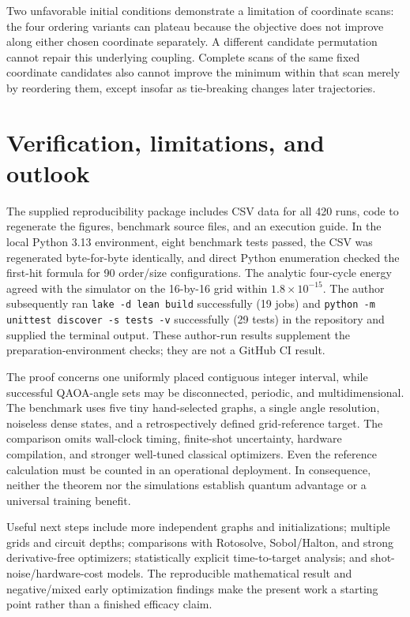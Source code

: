 \documentclass[10pt,a4paper]{article}
\begin{document}
Two unfavorable initial conditions demonstrate a limitation of coordinate scans: the four ordering variants can plateau because the objective does not improve along either chosen coordinate separately. A different candidate permutation cannot repair this underlying coupling. Complete scans of the same fixed coordinate candidates also cannot improve the minimum within that scan merely by reordering them, except insofar as tie-breaking changes later trajectories.

\section{Verification, limitations, and outlook}
The supplied reproducibility package includes CSV data for all 420 runs, code to regenerate the figures, benchmark source files, and an execution guide. In the local Python 3.13 environment, eight benchmark tests passed, the CSV was regenerated byte-for-byte identically, and direct Python enumeration checked the first-hit formula for 90 order/size configurations. The analytic four-cycle energy agreed with the simulator on the 16-by-16 grid within $1.8\times 10^{-15}$. The author subsequently ran \texttt{lake -d lean build} successfully (19 jobs) and \texttt{python -m unittest discover -s tests -v} successfully (29 tests) in the repository and supplied the terminal output. These author-run results supplement the preparation-environment checks; they are not a GitHub CI result.

The proof concerns one uniformly placed contiguous integer interval, while successful QAOA-angle sets may be disconnected, periodic, and multidimensional. The benchmark uses five tiny hand-selected graphs, a single angle resolution, noiseless dense states, and a retrospectively defined grid-reference target. The comparison omits wall-clock timing, finite-shot uncertainty, hardware compilation, and stronger well-tuned classical optimizers. Even the reference calculation must be counted in an operational deployment. In consequence, neither the theorem nor the simulations establish quantum advantage or a universal training benefit.

Useful next steps include more independent graphs and initializations; multiple grids and circuit depths; comparisons with Rotosolve, Sobol/Halton, and strong derivative-free optimizers; statistically explicit time-to-target analysis; and shot-noise/hardware-cost models. The reproducible mathematical result and negative/mixed early optimization findings make the present work a starting point rather than a finished efficacy claim.
\end{document}
